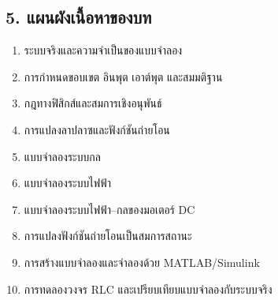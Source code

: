 
\subsection{5. แผนผังเนื้อหาของบท}

\begin{enumerate}
    \item ระบบจริงและความจำเป็นของแบบจำลอง
    \item การกำหนดขอบเขต อินพุต เอาต์พุต และสมมติฐาน
    \item กฎทางฟิสิกส์และสมการเชิงอนุพันธ์
    \item การแปลงลาปลาซและฟังก์ชันถ่ายโอน
    \item แบบจำลองระบบกล
    \item แบบจำลองระบบไฟฟ้า
    \item แบบจำลองระบบไฟฟ้า–กลของมอเตอร์ DC
    \item การแปลงฟังก์ชันถ่ายโอนเป็นสมการสถานะ
    \item การสร้างแบบจำลองและจำลองด้วย MATLAB/Simulink
    \item การทดลองวงจร RLC และเปรียบเทียบแบบจำลองกับระบบจริง
\end{enumerate}


